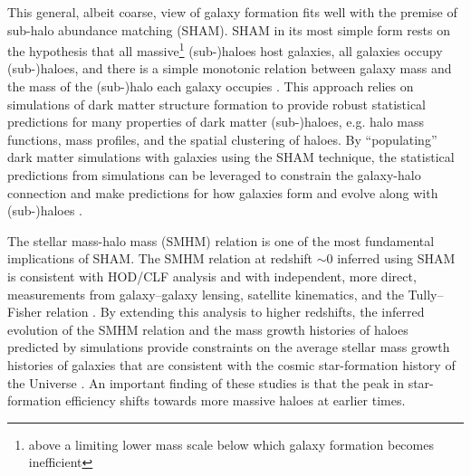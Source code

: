\documentclass[useAMS,fleqn,usenatbib]{mnras}
\begin{document}
This general, albeit coarse, view of galaxy formation fits well with the premise of sub-halo abundance matching (SHAM).  SHAM in its most simple form rests on the hypothesis that all massive\footnote{above a limiting lower mass scale below which galaxy formation becomes inefficient} (sub-)haloes host galaxies, all galaxies occupy (sub-)haloes, and there is a simple monotonic relation between galaxy mass and the mass of the (sub-)halo each galaxy occupies \citep{Kravtsov:2004fi, Vale:2004bb, Conroy:2006iz}.  This approach relies on simulations of dark matter structure formation to provide robust statistical predictions for many properties of dark matter (sub-)haloes, e.g. halo mass functions, mass profiles, and the spatial clustering of haloes.  By ``populating'' dark matter simulations with galaxies using the SHAM technique, the statistical predictions from simulations can be leveraged to constrain the galaxy-halo connection and make predictions for how galaxies form and evolve along with (sub-)haloes \citep{Springel:2006fq}. 

The stellar mass-halo mass (SMHM) relation is one of the most fundamental implications of SHAM.  The SMHM relation at redshift $\sim 0$ inferred using SHAM is consistent with HOD/CLF analysis \citep{Yang:2003du, vandenBosch:2003fd, vandenBosch:2007ea, Yang:2013hw, Zu:2015tt} and with independent, more direct, measurements from galaxy--galaxy lensing, satellite kinematics, and the Tully--Fisher relation \citep{vandenBosch:2004mn, Wang:2006fe, More:2009ws, Guo:2010do, Wang:2010ho, Moster:2010ep, Behroozi:2010ja, Mandelbaum:2015wt, Desmond:2015gr, vanUitert:2016fy}.  By extending this analysis to higher redshifts, the inferred evolution of the SMHM relation and the mass growth histories of haloes predicted by simulations provide constraints on the average stellar mass growth histories of galaxies that are consistent with the cosmic star-formation history of the Universe \citep{Conroy:2009ba, Wang:2010ho, Yang:2012ew, Moster:2013ab, Behroozi:2013fg, RodriguezPuebla:2017uo}.  An important finding of these studies is that the peak in star-formation efficiency shifts towards more massive haloes at earlier times. 
\end{document}

